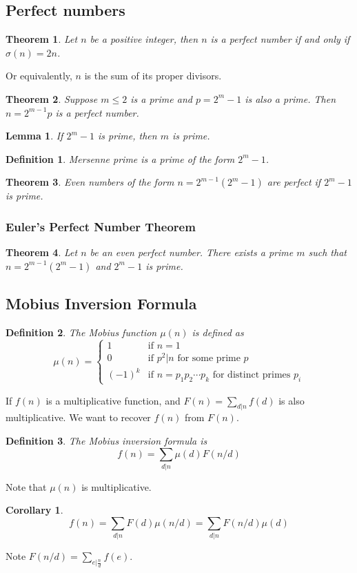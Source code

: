 \documentclass[letterpaper,12pt,oneside]{article}
\newtheorem{theorem}{Theorem}
\newtheorem{definition}{Definition}
\newtheorem*{corollary}{Corollary}
\newtheorem*{lemma}{Lemma}
\begin{document}
\subsection{Perfect numbers}
\begin{theorem}
    Let $n$ be a positive integer, then $n$ is a perfect number if and only if $\sigma(n) = 2n$.
\end{theorem}
Or equivalently, $n$ is the sum of its proper divisors.
\begin{theorem}
    Suppose $m\leq 2$ is a prime and $p=2^m-1$ is also a prime. Then $n=2^{m-1}p$ is a perfect number.
\end{theorem}
\begin{lemma}
    If $2^m-1$ is prime, then $m$ is prime.
\end{lemma}
\begin{definition}
    Mersenne prime is a prime of the form $2^m-1$.
\end{definition}
\begin{theorem}
    Even numbers of the form $n=2^{m-1}(2^m-1)$ are perfect if $2^m-1$ is prime.
\end{theorem}
\subsubsection{Euler's Perfect Number Theorem}
\begin{theorem}
    Let $n$ be an even perfect number. There exists a prime $m$ such that $n = 2^{m-1}(2^m-1)$ and $2^m-1$ is prime.
\end{theorem}
\subsection{Mobius Inversion Formula}
\begin{definition}
    The Mobius function $\mu(n)$ is defined as \[
        \mu(n) = \begin{cases}
            1 & \text{if } n=1\\
            0 & \text{if } p^2|n \text{ for some prime } p\\
            (-1)^k & \text{if } n = p_1p_2\cdots p_k \text{ for distinct primes } p_i
        \end{cases}
    \]
\end{definition}
If $f(n)$ is a multiplicative function, and $F(n) = \sum_{d|n} f(d)$ is also multiplicative. We want to recover $f(n)$ from $F(n)$.
\begin{definition}
    The Mobius inversion formula is \[
        f(n) = \sum_{d|n} \mu(d)F(n/d)
    \]
\end{definition}
Note that $\mu(n)$ is multiplicative.
\begin{corollary}
    \[
        f(n) = \sum_{d|n} F(d)\mu(n/d) = \sum_{d|n} F(n/d)\mu(d)
    \]
\end{corollary}
Note $F(n/d) = \sum_{e| \frac{n}{d}} f(e)$. 
\end{document}
